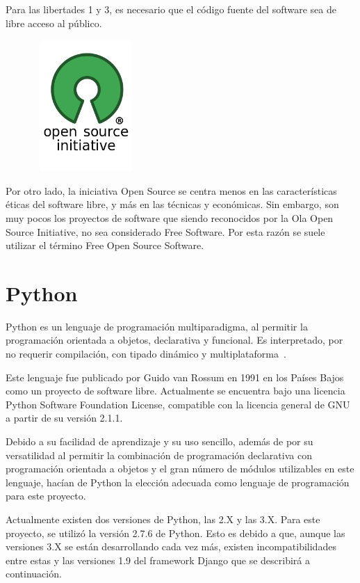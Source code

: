 \documentclass[a4paper, spanish, 12pt]{book}
\begin{document}
Para las libertades 1 y 3, es necesario que el c\'odigo fuente del software sea
de libre acceso al p\'ublico.

\begin{figure}[H]
  \centering
  \includegraphics[height=5cm, width=4cm, keepaspectratio]{img/Opensource}
\end{figure}

Por otro lado, la iniciativa Open Source se centra menos en las caracter\'isticas
\'eticas del software libre, y m\'as en las t\'ecnicas y econ\'omicas. Sin embargo,
son muy pocos los proyectos de software que siendo reconocidos por la Ola Open
Source Initiative, no sea considerado Free Software. Por esta raz\'on se suele
utilizar el t\'ermino Free Open Source Software.

\section{Python}
\label{sec:python}

Python es un lenguaje de programaci\'on multiparadigma, al permitir la programaci\'on
orientada a objetos, declarativa y funcional. Es interpretado, por no requerir
compilaci\'on, con tipado din\'amico y multiplataforma~\cite{python}.

Este lenguaje fue publicado por Guido van Rossum en 1991 en los Pa\'ises Bajos
como un proyecto de software libre. Actualmente se encuentra bajo una licencia
Python Software Foundation License, compatible con la licencia general de GNU a partir
de su versi\'on 2.1.1.

Debido a su facilidad de aprendizaje y su uso sencillo, adem\'as de por su versatilidad
al permitir la combinaci\'on de programaci\'on declarativa con programaci\'on orientada
a objetos y el gran n\'umero de m\'odulos utilizables en este lenguaje, hac\'ian de Python
la elecci\'on adecuada como lenguaje de programaci\'on para este proyecto.

Actualmente existen dos versiones de Python, las 2.X y las 3.X. Para este proyecto,
se utiliz\'o la versi\'on 2.7.6 de Python. Esto es debido a que, aunque las versiones
3.X se est\'an desarrollando cada vez m\'as, existen incompatibilidades entre estas
y las versiones 1.9 del framework Django que se describir\'a a continuaci\'on.
\end{document}
